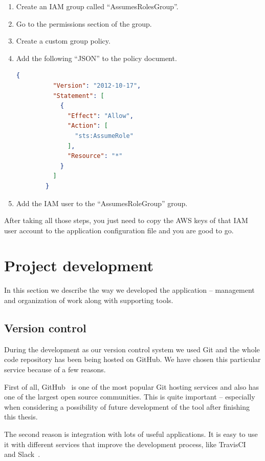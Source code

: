 \documentclass[licencjacka,en]{thesisclass}
\begin{document}
    \begin{enumerate}
        \item Create an IAM group called “AssumesRolesGroup”.
        \item Go to the permissions section of the group.
        \item Create a custom group policy.
        \item Add the following “JSON” to the policy document.

        \begin{lstlisting}[language=json,firstnumber=1]
        {
          "Version": "2012-10-17",
          "Statement": [
            {
              "Effect": "Allow",
              "Action": [
                "sts:AssumeRole"
              ],
              "Resource": "*"
            }
          ]
        }
        \end{lstlisting}

        \item Add the IAM user to the “AssumesRoleGroup” group.
    \end{enumerate}

    After taking all those steps, you just need to copy
    the AWS keys of that IAM user account
    to the application configuration file and you are good to go.


    \chapter{Project development}

    In this section we describe the way we developed
    the application -- management and organization of work along with supporting tools.

    \section{Version control}

    During the development as our version control system we used Git
    and the whole code repository has been being hosted on GitHub.
    We have chosen this particular service because of a few reasons.

    First of all, GitHub~\cite{GitHub} is one of the most popular Git hosting services
    and also has one of the largest open source communities.
    This is quite important -- especially when considering a possibility of
    future development of the tool after finishing this thesis.

    The second reason is integration with lots of useful applications.
    It is easy to use it with different services that improve the development
    process, like TravisCI~\cite{TravisCI} and Slack~\cite{Slack}.
\end{document}
